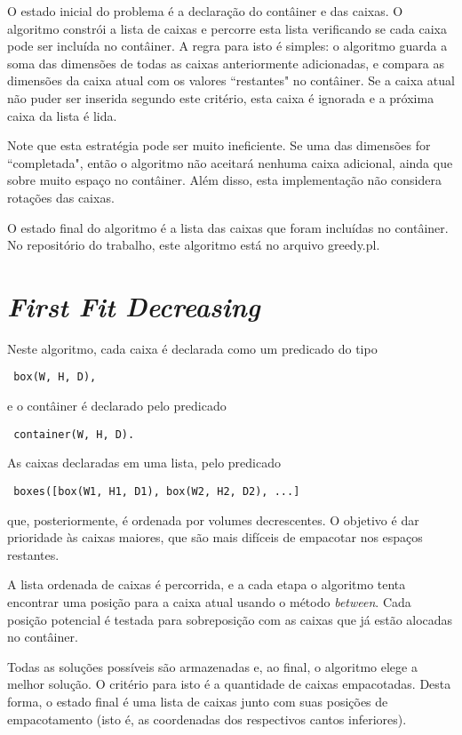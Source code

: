 \documentclass[12pt]{article}
\begin{document}
O estado inicial do problema é a declaração do contâiner e das caixas. O algoritmo constrói a lista de caixas e percorre esta lista verificando se cada caixa pode ser incluída no contâiner. A regra para isto é simples: o algoritmo guarda a soma das dimensões de todas as caixas anteriormente adicionadas, e compara as dimensões da caixa atual com os valores ``restantes" no contâiner. Se a caixa atual não puder ser inserida segundo este critério, esta caixa é ignorada e a próxima caixa da lista é lida.

Note que esta estratégia pode ser muito ineficiente. Se uma das dimensões for ``completada", então o algoritmo não aceitará nenhuma caixa adicional, ainda que sobre muito espaço no contâiner. Além disso, esta implementação não considera rotações das caixas.

O estado final do algoritmo é a lista das caixas que foram incluídas no contâiner. No repositório do trabalho, este algoritmo está no arquivo greedy.pl.

\section{\emph{First Fit Decreasing}}

Neste algoritmo, cada caixa é declarada como um predicado do tipo
\begin{verbatim} box(W, H, D),
\end{verbatim}
e o contâiner é declarado pelo predicado
\begin{verbatim} container(W, H, D).
\end{verbatim}
As caixas declaradas em uma lista, pelo predicado
\begin{verbatim} boxes([box(W1, H1, D1), box(W2, H2, D2), ...]
\end{verbatim}
que, posteriormente, é ordenada por volumes decrescentes. O objetivo é dar prioridade às caixas maiores, que são mais difíceis de empacotar nos espaços restantes.

A lista ordenada de caixas é percorrida, e a cada etapa o algoritmo tenta encontrar uma posição para a caixa atual usando o método \emph{between}. Cada posição potencial é testada para sobreposição com as caixas que já estão alocadas no contâiner.

Todas as soluções possíveis são armazenadas e, ao final, o algoritmo elege a melhor solução. O critério para isto é a quantidade de caixas empacotadas. Desta forma, o estado final é uma lista de caixas junto com suas posições de empacotamento (isto é, as coordenadas dos respectivos cantos inferiores).
\end{document}
